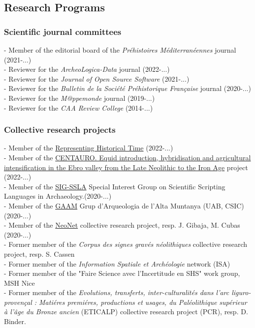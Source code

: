 \documentclass{article}
\begin{document}
\subsection*{Research Programs}

\subsubsection*{Scientific journal committees}

- Member of the editorial board of the \textit{Pr\'{e}histoires M\'{e}diterran\'{e}ennes} journal (2021-...)\\ 
- Reviewer for the \textit{ArcheoLogica-Data} journal (2022-...)\\
- Reviewer for the \textit{Journal of Open Source Software} (2021-...)\\
- Reviewer for the \textit{Bulletin de la Soci\'{e}t\'{e} Pr\'{e}historique Fran\c{c}aise} journal (2020-...)\\
- Reviewer for the \textit{M@ppemonde} journal (2019-...)\\ 
- Reviewer for the \textit{CAA Review College} (2014-...)\\ 

\subsubsection*{Collective research projects}

- Member of the \href{https://github.com/historical-time}{Representing Historical Time} (2022-...)\\ 
- Member of the \href{https://www.centaur-o.com/}{CENTAURO. Equid introduction, hybridisation and agricultural intensification in the Ebro valley from the Late Neolithic to the Iron Age} project (2022-...)\\ 
- Member of the \href{https://sslarch.github.io/}{SIG-SSLA} Special Interest Group on Scientific Scripting Languages in Archaeology.(2020-...)\\ 
- Member of the \href{https://arqueologiademuntanya.wordpress.com/}{GAAM} Grup d'Arqueologia de l'Alta Muntanya (UAB, CSIC) (2020-...)\\ 
- Member of the \href{https://redneonet.com/}{NeoNet} collective research project, resp. J. Gibaja, M. Cubas (2020-...)\\ 
- Former member of the \textit{Corpus des signes grav\'{e}s n\'{e}olithiques} collective research project, resp. S. Cassen\\
- Former member of the \textit{Information Spatiale et Arch\'{e}ologie} network (ISA)\\ 
- Former member of the "Faire Science avec l'Incertitude en SHS" work group, MSH Nice\\ 
- Former member of the \textit{Evolutions, transferts, inter-culturalit\'{e}s dans l'arc liguro-proven\c{c}al : Mati\'{e}res premi\'{e}res, productions et usages, du Pal\'{e}olithique sup\'{e}rieur \`{a} l'\^{a}ge du Bronze ancien} (ETICALP) collective research project (PCR), resp. D. Binder.
\end{document}
